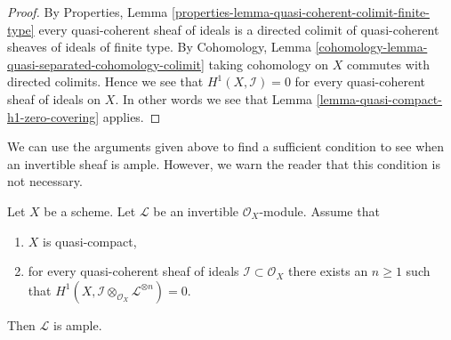 \begin{proof}
By
Properties, Lemma \ref{properties-lemma-quasi-coherent-colimit-finite-type}
every quasi-coherent sheaf of ideals is a directed colimit of
quasi-coherent sheaves of ideals of finite type.
By Cohomology, Lemma \ref{cohomology-lemma-quasi-separated-cohomology-colimit}
taking cohomology on $X$ commutes with directed colimits.
Hence we see that $H^1(X, \mathcal{I}) = 0$
for every quasi-coherent sheaf of ideals on $X$. In other words
we see that Lemma \ref{lemma-quasi-compact-h1-zero-covering} applies.
\end{proof}

\noindent
We can use the arguments given above to find a sufficient condition to
see when an invertible sheaf is ample. However, we warn the reader that
this condition is not necessary.

\begin{lemma}
\label{lemma-quasi-compact-h1-zero-invertible}
Let $X$ be a scheme. Let $\mathcal{L}$ be an invertible $\mathcal{O}_X$-module.
Assume that
\begin{enumerate}
\item $X$ is quasi-compact,
\item for every quasi-coherent sheaf of ideals
$\mathcal{I} \subset \mathcal{O}_X$
there exists an $n \geq 1$ such that
$H^1(X, \mathcal{I} \otimes_{\mathcal{O}_X} \mathcal{L}^{\otimes n}) = 0$.
\end{enumerate}
Then $\mathcal{L}$ is ample.
\end{lemma}

